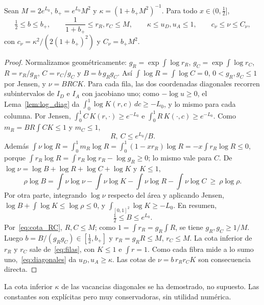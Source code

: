 \begin{proposicion}\label{prop:cotas}
Sean $M=2e^{L_0}$, $b_+=e^{L_0}M^2$ y $\kappa=(1+b_+M^2)^{-1}$. Para todo $x\in(0,\frac12]$,
\[
 \tfrac12\le b\le b_+,\qquad \frac1{1+b_+}\le r_R,r_C\le M,\qquad \kappa\le u_D,u_A\le1,\qquad
 c_\nu\le\nu\le C_\nu,
\]
con $c_\nu=\kappa^2/(2(1+b_+)^2)$ y $C_\nu=b_+M^2$.
\end{proposicion}

\begin{proof}
Normalizamos geométricamente: $g_R=\exp\int\log r_R$, $g_C=\exp\int\log r_C$, $R=r_R/g_R$,
$C=r_C/g_C$ y $B=b\,g_Rg_C$. Así $\int\log R=\int\log C=0$, $0<g_R,g_C\le1$ por Jensen, y
$\nu=BRCK$. Para cada fila, las dos coordenadas diagonales recorren subintervalos de $I_D$ e $I_A$
con jacobiano uno; como $-\log u\ge0$, el Lema~\ref{lem:log_diag} da $\int_0^1\log K(r,c)\,dc\ge-L_0$,
y lo mismo para cada columna. Por Jensen, $\int_0^1C\,K(r,\cdot)\ge e^{-L_0}$ e
$\int_0^1R\,K(\cdot,c)\ge e^{-L_0}$. Como $m_R=BR\int CK\le1$ y $m_C\le1$,
\begin{equation}\label{eq:cota_RC}
 R,\ C\le e^{L_0}/B .
\end{equation}
Además $\int\nu\log R=\int_0^1m_R\log R=\int_0^1(1-xr_R)\log R=-x\int r_R\log R\le0$, porque
$\int r_R\log R=\int r_R\log r_R-\log g_R\ge0$; lo mismo vale para $C$. De
$\log\nu=\log B+\log R+\log C+\log K$ y $K\le1$,
\[
 \rho\log B=\int\nu\log\nu-\int\nu\log K-\int\nu\log R-\int\nu\log C\ \ge\ \rho\log\rho .
\]
Por otra parte, integrando $\log\nu$ respecto del área y aplicando Jensen,
$\log B+\int\log K\le\log\rho\le0$, y $\int_{[0,1]^2}\log K\ge-L_0$. En resumen,
\begin{equation}\label{eq:cota_B}
 \tfrac12\le B\le e^{L_0}.
\end{equation}
Por~\eqref{eq:cota_RC}, $R,C\le M$; como $1=\int r_R=g_R\int R$, se tiene $g_R,g_C\ge1/M$. Luego
$b=B/(g_Rg_C)\in[\frac12,b_+]$ y $r_R=g_RR\le M$, $r_C\le M$. La cota inferior de $r_R$ y $r_C$ sale
de~\eqref{eq:filas}, con $K\le1$ e $\int r=1$. Como cada fibra mide a lo sumo uno,~\eqref{eq:diagonales} da
$u_D,u_A\ge\kappa$. Las cotas de $\nu=b\,r_Rr_CK$ son consecuencia directa.
\end{proof}

La cota inferior $\kappa$ de las vacancias diagonales se ha demostrado, no supuesto. Las constantes son explícitas pero muy
conservadoras, sin utilidad numérica.
